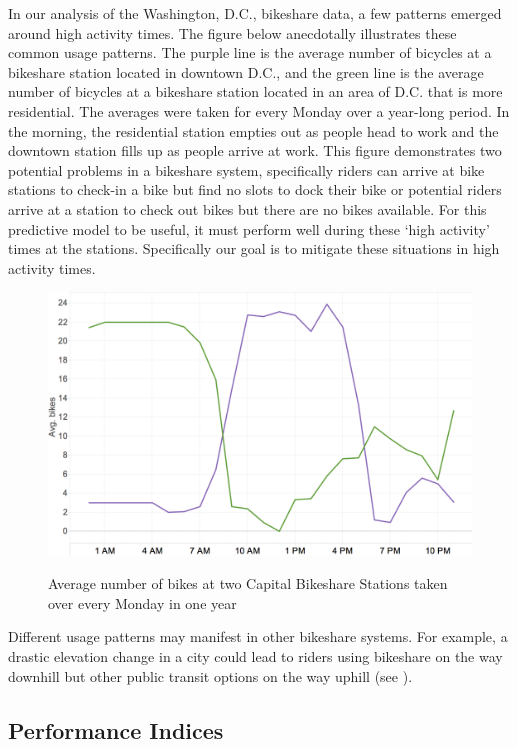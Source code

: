 \documentclass{acm_proc_article-sp}
\begin{document}
In our analysis of the Washington, D.C., bikeshare data, a few patterns emerged around high activity times. The figure below anecdotally illustrates these common usage patterns. The purple line is the average number of bicycles at a bikeshare station located in downtown D.C., and the green line is the average number of bicycles at a bikeshare station located in an area of D.C. that is more residential. The averages were taken for every Monday over a year-long period. In the morning, the residential station empties out as people head to work and the downtown station fills up as people arrive at work. This figure demonstrates two potential problems in a bikeshare system, specifically riders can arrive at bike stations to check-in a bike but find no slots to dock their bike or potential riders arrive at a station to check out bikes but there are no bikes available.  For this predictive model to be useful, it must perform well during these `high activity' times at the stations. Specifically our goal is to mitigate these situations in high activity times.

\begin{figure} [!h]
\caption{Average number of bikes at two Capital Bikeshare Stations taken over every Monday in one year}
\centering
\includegraphics[scale = 0.35]{stations_over_time.png}
\label{fig:stations_over_time}
\end{figure}

Different usage patterns may manifest in other bikeshare systems. For example, a drastic elevation change in a city could lead to riders using bikeshare on the way downhill but other public transit options on the way uphill (see \cite{lin:chou}).
\vspace{0.5cm}

\subsection{Performance Indices}
\end{document}
